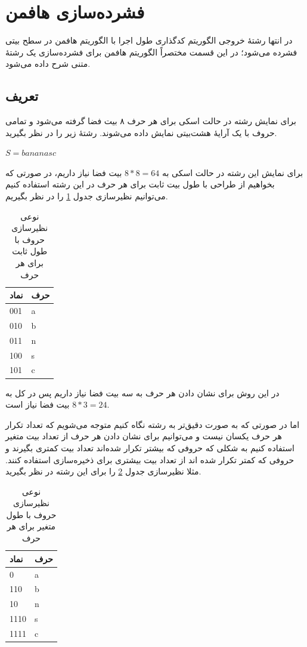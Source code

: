 \section{فشرده‌سازی هافمن }
در انتها رشتهٔ خروجی الگوریتم کدگذاری طول اجرا با الگوریتم هافمن در سطح بیتی فشرده‌ می‌شود؛
در این قسمت مختصراً الگوریتم هافمن برای فشرده‌سازی یک رشتهٔ متنی شرح داده می‌شود.

\subsection{تعریف}
برای نمایش رشته در حالت 
اسکی
برای هر حرف ۸ بیت فضا گرفته می‌شود و تمامی حروف با یک آرایهٔ هشت‌بیتی
نمایش داده می‌شوند. رشتهٔ زیر را در نظر بگیرید.
\begin{center}
        $S = bananasc$
\end{center}

برای نمایش این رشته در حالت اسکی به 
$ 8 * 8 = 64$ 
بیت فضا نیاز داریم، در صورتی که بخواهیم از طراحی 
با طول بیت ثابت برای هر حرف در این رشته استفاده کنیم می‌توانیم نظیرسازی 
جدول
\ref{huffman_fixed}
 را در نظر بگیریم. 

\begin{table}[H]
        \centering
        \caption{نوعی نظیرسازی حروف با طول ثابت برای هر حرف}
        \label{huffman_fixed}
        \begin{tabular}{ll}
        \hline
        نماد & حرف \\ \hline
        001 & a \\
        010 & b \\
        011 & n \\
        100 & s \\
        101 & c \\ \hline
        \end{tabular}
\end{table}

در این روش برای نشان دادن هر حرف به سه بیت فضا نیاز داریم پس در کل به
$ 8 * 3 = 24 $
بیت فضا نیاز است. 

اما در صورتی که به صورت دقیق‌تر به رشته نگاه کنیم متوجه می‌شویم که تعداد تکرار هر حرف
یکسان نیست و می‌توانیم برای نشان دادن هر حرف از تعداد بیت متغیر استفاده کنیم به شکلی که 
حروفی که بیشتر تکرار شده‌اند تعداد بیت کمتری بگیرند و حروفی که کمتر تکرار
شده اند از تعداد بیت بیشتری برای ذخیره‌‌سازی استفاده کنند. مثلا نظیرسازی جدول
\ref{huffman} 
را برای این رشته در نظر بگیرید.

\begin{table}[H]
        \centering
        \caption{نوعی نظیرسازی حروف با طول متغیر برای هر حرف}
        \label{huffman}
        \begin{tabular}{ll}
        \hline
        نماد & حرف \\ \hline
        0 & a \\
        110 & b \\
        10 & n \\
        1110 & s \\
        1111 & c \\ \hline
        \end{tabular}
\end{table}

